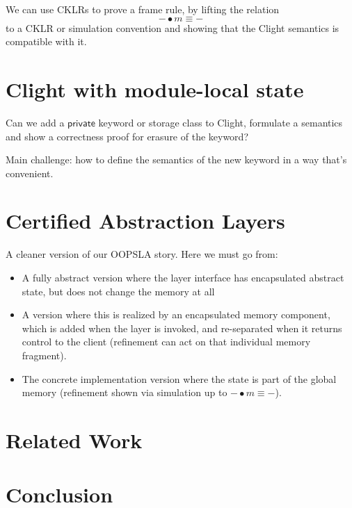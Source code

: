 \documentclass[acmsmall,screen,review,anonymous]{acmart}
\begin{document}
We can use CKLRs to prove a frame rule,
by lifting the relation
\[
    {-} \bullet m \equiv {-}
\]
to a CKLR or simulation convention
and showing that the Clight semantics
is compatible with it.

\section{Clight with module-local state}

Can we add a $\mathsf{private}$ keyword or storage class to Clight,
formulate a semantics and show a correctness proof
for erasure of the keyword?

Main challenge: how to define the semantics of the new keyword
in a way that's convenient.

\section{Certified Abstraction Layers}

A cleaner version of our OOPSLA story.
Here we must go from:
\begin{itemize}
  \item A fully abstract version where the layer interface
    has encapsulated abstract state,
    but does not change the memory at all
  \item A version where this is realized by an encapsulated
    memory component,
    which is added when the layer is invoked,
    and re-separated when it returns control to the client
    (refinement can act on that individual memory fragment).
  \item The concrete implementation version
    where the state is part of the global memory
    (refinement shown via
    simulation up to ${-} \bullet m \equiv {-}$).
\end{itemize}

\section{Related Work}

\section{Conclusion}
\end{document}
